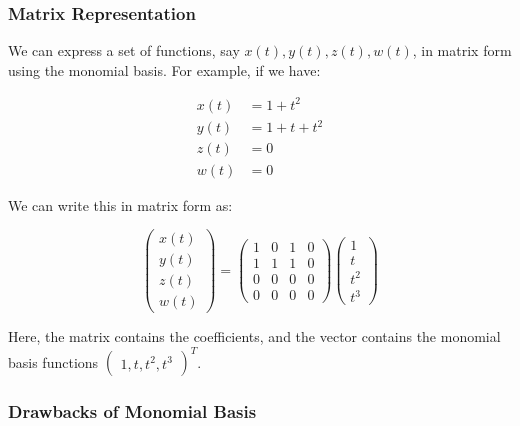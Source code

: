 \documentclass{article}
\begin{document}
\subsubsection{Matrix Representation}

We can express a set of functions, say \(x(t), y(t), z(t), w(t)\), in matrix form using the monomial basis. For example, if we have:

\begin{align*}
x(t) &= 1 + t^2 \\
y(t) &= 1 + t + t^2 \\
z(t) &= 0 \\
w(t) &= 0
\end{align*}

We can write this in matrix form as:

\[ \begin{pmatrix} x(t) \\ y(t) \\ z(t) \\ w(t) \end{pmatrix} = \begin{pmatrix} 1 & 0 & 1 & 0 \\ 1 & 1 & 1 & 0 \\ 0 & 0 & 0 & 0 \\ 0 & 0 & 0 & 0 \end{pmatrix} \begin{pmatrix} 1 \\ t \\ t^2 \\ t^3 \end{pmatrix} \]

Here, the matrix contains the coefficients, and the vector contains the monomial basis functions \(\begin{pmatrix} 1, t, t^2, t^3 \end{pmatrix}^T\).

\subsubsection{Drawbacks of Monomial Basis}
\end{document}
